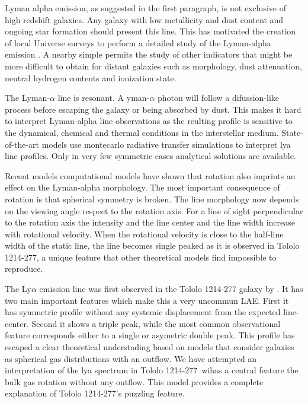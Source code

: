 \documentclass[a4paper, usenatbib, 12pt]{article}
\newcommand{\tol}{Tololo 1214-277}
\begin{document}
{Lyman alpha emission, as suggested in the first paragraph, is not
exclusive of high redshift galaxies. Any galaxy with low metallicity
and dust content and ongoing star formation should present this line.  This has motivated the creation of
local Universe surveys to perform a detailed study of the Lyman-alpha
emission \cite{LARS}. A nearby simple permits the study of other
indicators that might be more difficult to obtain for distant galaxies
such as morphology, dust attenuation, neutral hydrogen contents and
ionization state. 


The Lyman-$\alpha$ line is resonant. A yman-$\alpha$ photon
will follow a difussion-like process before escaping the galaxy or
being absorbed by dust. This makes it hard to interpret Lyman-alpha
line observations as the reulting profile is sensitive to the
dynamical, chemical and thermal conditions in the interstellar
medium. State-of-the-art models use montecarlo radiative transfer
simulations to interpret lya line profiles. Only in very few symmetric
cases analytical solutions are available.

Recent models computational models \cite{GaravitoCamargo2014} have
shown that rotation also imprints an effect on the Lyman-alpha
morphology.  
The most important consequence of rotation is that spherical 
symmetry is broken.
The line morphology now depends on the viewing angle respect to the
rotation axis.  
For a line of sight perpendicular to the rotation axis the intensity
and the line center and the line width increase with rotational
velocity.  
When the rotational velocity is close to the half-line width of the
static line, the line becomes single peaked as it is observed in
\tol, a unique feature that other theoretical models find
impossible to reproduce.
 

The Ly$\alpha$ emission line was first observed in the \tol
galaxy by \cite{Thuan97}. It has two main important features which 
make this a very uncommun LAE. First it has symmetric profile 
without any systemic displacement from the expected
line-center. Second it shows a triple peak, while the most common
observational feature corresponds either to a single or asymetric
double peak. 
This profile has escaped a clear theoretical understading based on
models that consider galaxies as spherical gas distributions with an
outflow. 
We have attempted an interpretation of the lya spectrum in \tol\ wihas
a central feature the bulk gas rotation without any outflow. This
model provides a complete explanation of \tol's puzzling feature.


}
\end{document}
